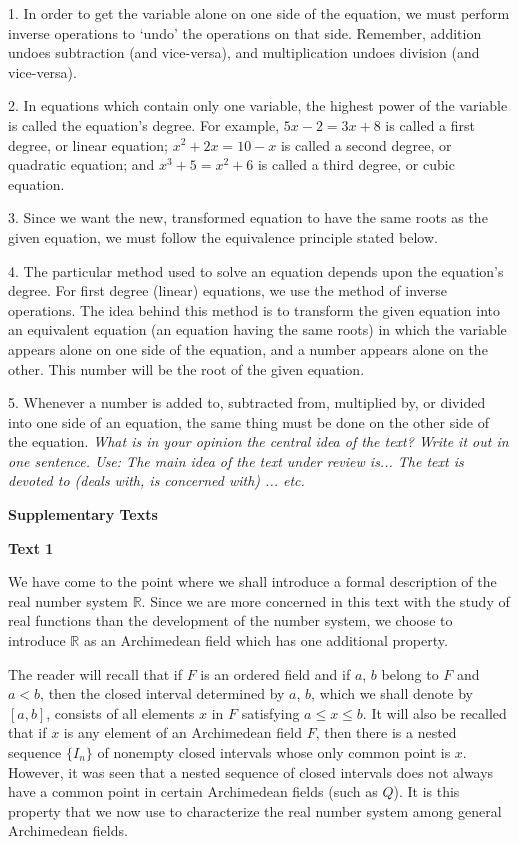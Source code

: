 \documentclass[a4paper]{article}
\newcommand{\ESect}[1]{\medskip\par{\large \textbf{#1}}\par}
\begin{document}
1. In order to get the variable alone on one side of the equation, we must perform inverse operations to `undo' the operations
on that side. Remember, addition undoes subtraction (and vice-versa), and multiplication undoes division (and vice-versa).

2. In equations which contain only one variable, the highest power of the variable is called the equation's degree. For
example, $5x-2=3x+8$ is called a first degree, or linear equation; $x^2+2x=10-x$ is called a second degree, or quadratic equation;
and $x^3+5=x^2+6$ is called a third degree, or cubic equation.

3. Since we want the new, transformed equation to have the same roots as the given equation, we must follow the equivalence
principle stated below.

4. The particular method used to solve an equation depends upon the equation's degree. For first degree (linear) equations,
we use the method of inverse operations. The idea behind this method is to transform the given equation into an equivalent
equation (an equation having the same roots) in which the variable appears alone on one side of the equation, and a number
appears alone on the other. This number will be the root of the given equation.

5. Whenever a number is added to, subtracted from, multiplied by, or divided into one side of an equation, the same thing must
be done on the other side of the equation.
\textit{What is in your opinion the central idea of the text? Write it out in one sentence. Use: The main idea of the text under review
is... The text is devoted to (deals with, is concerned with) ... etc.}

\ESect{Supplementary Texts}
\ESect{Text 1}
We have come to the point where we shall introduce a formal description of the real number system $\mathbb{R}$. Since we are more
concerned in this text with the study of real functions than the development of the number system, we choose to introduce
$\mathbb{R}$ as an Archimedean field which has one additional property.

The reader will recall that if $F$ is an ordered field and if $a$, $b$ belong to $F$ and $a < b$, then the closed interval
determined by $a$, $b$, which we shall denote by $[a, b]$, consists of all elements $x$ in $F$ satisfying $a \leqslant x \leqslant b$.
It will also be recalled that if $x$ is any element of an Archimedean field $F$, then there is a nested sequence $\{I_n\}$ of
nonempty closed intervals whose only common point is $x$. However, it was seen that a nested sequence of closed intervals does
not always have a common point in certain Archimedean fields (such as $Q$). It is this property that we now use to characterize
the real number system among general Archimedean fields.
\end{document}
